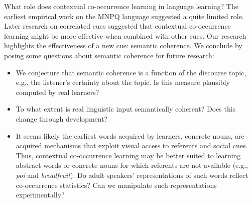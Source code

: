 \documentclass[man,floatsintext]{apa6}
\begin{document}






What role does contextual co-occurrence learning in language learning? The earliest empirical work on the MNPQ language suggested a quite limited role. Later research on correlated cues suggested that contextual co-occurrence learning might be more effective when combined with other cues. Our research highlights the effectiveness of a new cue: semantic coherence. We conclude by posing some questions about semantic coherence for future research:

\begin{itemize}
\item We conjecture that semantic coherence is a function of the discourse topic, e.g., the listener's certainty about the topic. Is this measure plausibly computed by real learners?
\item To what extent is real linguistic input semantically coherent? Does this change through development?
\item It seems likely the earliest words acquired by learners, concrete nouns, are acquired mechanisms that exploit visual access to referents and social cues. Thus, contextual co-occurrence learning may be better suited to learning abstract words or concrete nouns for which referents are not available (e.g., \emph{poi} and \emph{breadfruit}). Do adult speakers' representations of such words reflect co-occurrence statistics? Can we manipulate such representations experimentally?
\end{itemize}

\nocite{*}
\newpage


\end{document}
